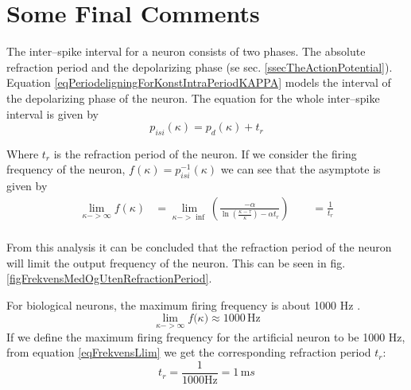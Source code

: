 



\section{Some Final Comments}
\label{ssecValueOfAlpha}

The inter--spike interval for a neuron consists of two phases. 
The absolute refraction period and the depolarizing phase (se sec. \ref{ssecTheActionPotential}).
Equation \eqref{eqPeriodeligningForKonstIntraPeriodKAPPA} models the interval of the depolarizing phase of the neuron. %
The equation for the whole inter--spike interval is given by
\begin{equation}
	p_{isi}(\kappa) = p_d(\kappa) + t_r
	\label{eqHeilePerioden}
\end{equation}

Where $t_r$ is the refraction period of the neuron. %
If we consider the firing frequency of the neuron, $f(\kappa) = p_{isi}^{-1}(\kappa)$ we can see that the asymptote is given by
\begin{equation}
	\begin{split}
		\lim_{\kappa->\infty}{ f(\kappa)} &= \lim_{\kappa->\inf}\left( \frac{-\alpha}{\ln \left( \frac{\kappa - \tau}{\kappa} \right) - \alpha t_r} \right)   \qquad = \frac{1}{t_r} \\ 
	\end{split}
	\label{eqFrekvensLlim} 
\end{equation}

From this analysis it can be concluded that the refraction period of the neuron will limit the output frequency of the neuron.
This can be seen in fig. \ref{figFrekvensMedOgUtenRefractionPeriod}.

For biological neurons, the maximum firing frequency is about 1000 Hz \cite{NeuroscienceExploringTheBrain3edKAP4}. %
\begin{equation}
	\lim_{\kappa->\infty}{ f(\kappa}) \approx 1000 \, \text{Hz}
\end{equation}
If we define the maximum firing frequency for the artificial neuron to be 1000 Hz, from equation \ref{eqFrekvensLlim} we get the corresponding refraction period $t_r$:
\begin{equation}
	t_r = \frac{1}{1000 \text{Hz}} = 1 \, \text{m}s %
\end{equation}

